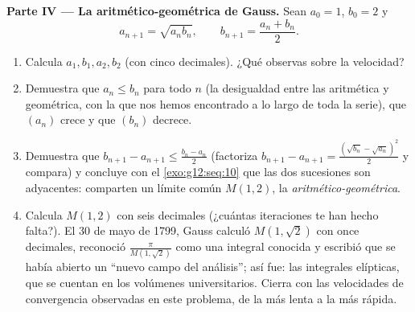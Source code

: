 \begin{problem}
\medskip
\noindent\textbf{Parte IV --- La  aritmético-geométrica de
Gauss.}
Sean $a_0 = 1$, $b_0 = 2$ y
\[
a_{n+1} = \sqrt{a_n b_n},
\qquad
b_{n+1} = \frac{a_n + b_n}{2} .
\]
\begin{enumerate}[resume]
  \item Calcula $a_1, b_1, a_2, b_2$ (con cinco decimales). ¿Qué observas
        sobre la velocidad?
  \item Demuestra que $a_n \leq b_n$ para todo $n$ (la desigualdad entre
        las  aritmética y geométrica, con la que nos hemos encontrado
        a lo largo de toda la serie), que $(a_n)$ crece y que $(b_n)$
        decrece.
  \item Demuestra que $b_{n+1} - a_{n+1} \leq \frac{b_n - a_n}{2}$
        (factoriza $b_{n+1} - a_{n+1} =
        \frac{(\sqrt{b_n} - \sqrt{a_n})^2}{2}$ y compara) y concluye con el
        \cref{exo:g12:seq:10} que las dos sucesiones son adyacentes:
        comparten un límite común $M(1, 2)$, la \emph{
        aritmético-geométrica}.
  \item Calcula $M(1, 2)$ con seis decimales (¿cuántas iteraciones te han
        hecho falta?). El 30 de mayo de 1799, Gauss calculó
        $M(1, \sqrt2)$ con once decimales, reconoció
        $\frac{\pi}{M(1,\sqrt2)}$ como una integral conocida y escribió que
        se había abierto un ``nuevo campo del análisis''; así fue: las
        integrales elípticas, que se cuentan en los volúmenes
        universitarios. Cierra con las velocidades de convergencia
        observadas en este problema, de la más lenta a la más rápida.
\end{enumerate}
\end{problem}
